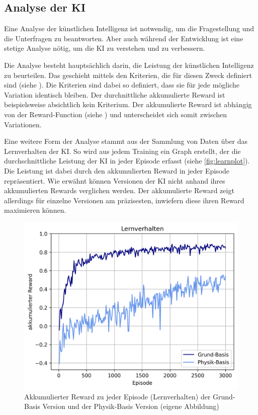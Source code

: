 \subsection{Analyse der KI}\label{sub:d_reflex_analys}
Eine Analyse der künstlichen Intelligenz ist notwendig, um die Fragestellung und die
Unterfragen zu beantworten. Aber auch während der Entwicklung ist eine
stetige Analyse nötig, um die KI zu verstehen und zu verbessern.

Die Analyse besteht hauptsächlich darin, die Leistung der künstlichen
Intelligenz zu beurteilen. Das geschieht mittels den Kriterien, die für diesen
Zweck definiert sind (siehe ). Die Kriterien sind dabei so
definiert, dass sie für jede mögliche Variation identisch bleiben. Der
durchnittliche akkumulierte Reward ist beispielsweise absichtlich kein
Kriterium. Der akkumulierte Reward ist abhängig von der Reward-Function (siehe
) und unterscheidet sich somit zwischen Variationen.

Eine weitere Form der Analyse stammt aus der Sammlung von Daten über das
Lernverhalten der KI. So wird aus jedem Training ein Graph erstellt, der die
durchschnittliche Leistung der KI in jeder Episode erfasst (siehe
\autoref{fig:learnplot}). Die Leistung ist dabei durch den akkumulierten Reward
in jeder Episode repräsentiert. Wie erwähnt können Versionen der KI nicht anhand
ihres akkumulierten Rewards verglichen werden. Der akkumulierte Reward zeigt
allerdings für einzelne Versionen am präzisesten, inwiefern diese ihren Reward
maximieren können.

\begin{figure}[!ht]
    \centering
    \includegraphics[width=\textwidth-2cm]{images/diskussion/learnplot.png}
    \caption{Akkumulierter Reward zu jeder Episode (Lernverhalten) der Grund-Basis Version und der Physik-Basis Version (eigene Abbildung)}\label{fig:learnplot}
\end{figure}


